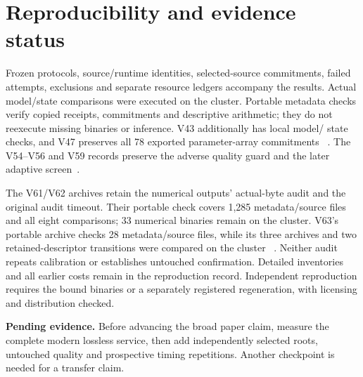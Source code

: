 \documentclass[10pt,twocolumn,letterpaper]{article}
\newcommand{\pending}[1]{\par\noindent\textbf{Pending evidence.} #1\par}
\begin{document}
\section{Reproducibility and evidence status}
Frozen protocols, source/runtime identities, selected-source commitments, failed
attempts, exclusions and separate resource ledgers accompany the results.
Actual model/state comparisons were executed on the cluster. Portable metadata
checks verify copied receipts, commitments and descriptive arithmetic; they do
not reexecute missing binaries or inference. V43 additionally has local model/
state checks, and V47 preserves all 78 exported parameter-array commitments
~\cite{v43,v47}. The V54--V56 and V59 records preserve the adverse quality guard
and the later adaptive screen~\cite{v58terminal,v59terminal}.

The V61/V62 archives retain the numerical outputs' actual-byte audit and the
original audit timeout. Their portable check covers 1,285 metadata/source files
and all eight comparisons; 33 numerical binaries remain on the cluster. V63's
portable archive checks 28 metadata/source files, while its three archives and
two retained-descriptor transitions were compared on the cluster
~\cite{v62terminal,v63terminal}. Neither audit repeats calibration or establishes
untouched confirmation. Detailed inventories and all earlier costs remain in
the reproduction record. Independent reproduction requires the bound binaries
or a separately registered regeneration, with licensing and distribution checked.

\pending{Before advancing the broad paper claim, measure the complete modern
lossless service, then add independently selected roots, untouched quality and
prospective timing repetitions. Another checkpoint is needed for a transfer claim.}
\end{document}
